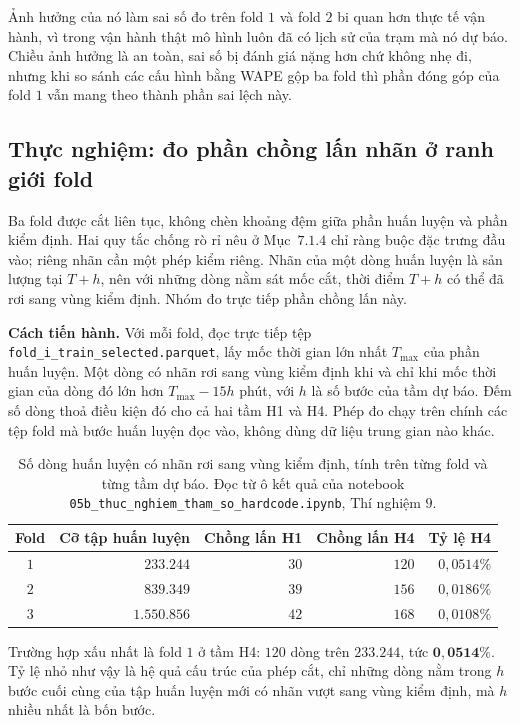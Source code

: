 \documentclass[12pt, a4paper]{report}
\begin{document}
Ảnh hưởng của nó làm sai số đo trên fold $1$ và fold $2$ bi quan hơn thực tế vận
hành, vì trong vận hành thật mô hình luôn đã có lịch sử của trạm mà nó dự báo. Chiều ảnh
hưởng là an toàn, sai số bị đánh giá nặng hơn chứ không nhẹ đi, nhưng khi so sánh các
cấu hình bằng WAPE gộp ba fold thì phần đóng góp của fold $1$ vẫn mang theo thành phần sai
lệch này.

\FloatBarrier
\subsection{Thực nghiệm: đo phần chồng lấn nhãn ở ranh giới fold}

Ba fold được cắt liên tục, không chèn khoảng đệm giữa phần huấn luyện và phần kiểm
định. Hai quy tắc chống rò rỉ nêu ở Mục~$7.1.4$ chỉ ràng buộc đặc trưng đầu
vào; riêng nhãn cần một phép kiểm riêng. Nhãn của một dòng huấn luyện là sản
lượng tại $T + h$, nên với những dòng nằm sát mốc cắt, thời điểm $T + h$ có thể đã rơi
sang vùng kiểm định. Nhóm đo trực tiếp phần chồng lấn này.

\textbf{Cách tiến hành.} Với mỗi fold, đọc trực tiếp tệp
\texttt{fold\_i\_train\_selected.parquet}, lấy mốc thời gian lớn nhất $T_{\max}$ của phần
huấn luyện. Một dòng có nhãn rơi sang vùng kiểm định khi và chỉ khi mốc thời gian của dòng đó lớn hơn
$T_{\max} - 15h$ phút, với $h$ là số bước của tầm dự báo. Đếm số dòng thoả điều kiện đó
cho cả hai tầm H1 và H4. Phép đo chạy trên chính các tệp fold mà bước huấn luyện đọc
vào, không dùng dữ liệu trung gian nào khác.

\begin{table}[htbp]
\centering
\caption{Số dòng huấn luyện có nhãn rơi sang vùng kiểm định, tính trên từng fold và
từng tầm dự báo. Đọc từ ô kết quả của notebook
\texttt{05b\_thuc\_nghiem\_tham\_so\_hardcode.ipynb}, Thí nghiệm $9$.}
\label{tab:chong_lan}
\small
\begin{tabular}{c r r r r}
\toprule
\textbf{Fold} & \textbf{Cỡ tập huấn luyện} & \textbf{Chồng lấn H1} & \textbf{Chồng lấn H4} & \textbf{Tỷ lệ H4} \\
\midrule
$1$ & $233.244$ & $30$ & $120$ & $0{,}0514\%$ \\
$2$ & $839.349$ & $39$ & $156$ & $0{,}0186\%$ \\
$3$ & $1.550.856$ & $42$ & $168$ & $0{,}0108\%$ \\
\bottomrule
\end{tabular}
\end{table}

Trường hợp xấu nhất là fold $1$ ở tầm H4: $120$ dòng trên $233.244$, tức
$\mathbf{0{,}0514\%}$. Tỷ lệ nhỏ như vậy là hệ quả cấu trúc của phép cắt, chỉ những dòng
nằm trong $h$ bước cuối cùng của tập huấn luyện mới có nhãn vượt sang vùng kiểm định, mà
$h$ nhiều nhất là bốn bước.
\end{document}
